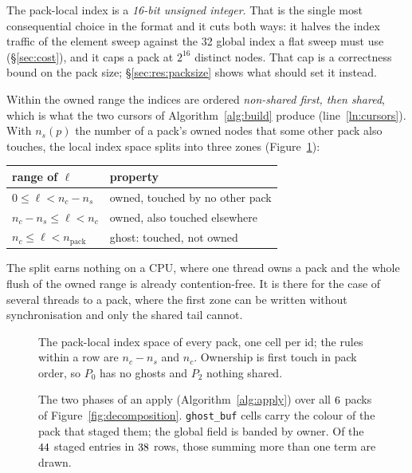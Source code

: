 \documentclass[sigconf,nonacm]{acmart}
\begin{document}
The pack-local index is a \emph{16-bit unsigned integer}. That is the single most consequential
choice in the format and it cuts both ways: it halves the index traffic of the element sweep
against the \SI{32}{\bit} global index a flat sweep must use (\S\ref{sec:cost}), and it caps a
pack at $2^{16}$ distinct nodes. That cap is a correctness bound on the pack size;
\S\ref{sec:res:packsize} shows what should set it instead.

Within the owned range the indices are ordered \emph{non-shared first, then shared}, which is
what the two cursors of Algorithm~\ref{alg:build} produce (line~\ref{ln:cursors}). With $n_s(p)$
the number of a pack's owned nodes that some other pack also touches, the local index space
splits into three zones (Figure~\ref{fig:idspace}):
\begin{center}
\begin{tabular}{ll}
\toprule
range of $\ell$ & property \\
\midrule
$0 \le \ell < n_c - n_s$ & owned, touched by no other pack \\
$n_c - n_s \le \ell < n_c$ & owned, also touched elsewhere \\
$n_c \le \ell < n_{\mathrm{pack}}$ & ghost: touched, not owned \\
\bottomrule
\end{tabular}
\end{center}

The split earns nothing on a CPU, where one thread owns a pack and the whole flush of the owned
range is already contention-free. It is there for the case of several threads to a pack, where
the first zone can be written without synchronisation and only the shared tail cannot.

\begin{figure}[t]
  \centering
  \resizebox{\columnwidth}{!}{}
  \caption{The pack-local index space of every pack, one cell per id; the rules within a row
    are $n_c-n_s$ and $n_c$. Ownership is first touch in pack order, so $P_0$ has no ghosts and
    $P_2$ nothing shared.}
  \label{fig:idspace}
\end{figure}

\begin{figure}[t]
  \centering
  \resizebox{\columnwidth}{!}{}
  \caption{The two phases of an apply (Algorithm~\ref{alg:apply}) over all $6$
    packs of Figure~\ref{fig:decomposition}. \texttt{ghost\_buf} cells carry the colour of the
    pack that staged them; the global field is banded by owner. Of the $44$
    staged entries in $38$ rows, those summing more than one term are drawn.}
  \label{fig:reduction}
\end{figure}
\end{document}
